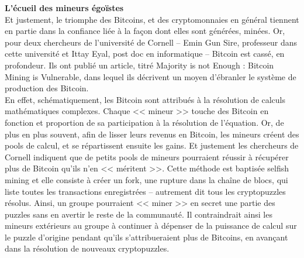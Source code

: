 \documentclass[11pt,twoside,a4paper]{article}
\begin{document}
\textbf{L'{\'e}cueil des mineurs {\'e}go{\"i}stes} ~\\

Et justement, le triomphe des Bitcoins, et des cryptomonnaies en g{\'e}n{\'e}ral tiennent en partie dans la confiance li{\'e}e {\`a} la fa\c{c}on dont elles sont g{\'e}n{\'e}r{\'e}es, min{\'e}es. Or, pour deux chercheurs de l'universit{\'e} de Cornell -- Emin Gun Sire, professeur dans cette universit{\'e} et Ittay Eyal, post doc en informatique -- Bitcoin est cass{\'e}, en profondeur. Ils ont publi{\'e} un article, titr{\'e} Majority is not Enough : Bitcoin Mining is Vulnerable, dans lequel ils d{\'e}crivent un moyen d'{\'e}branler le syst{\`e}me de production des Bitcoin. ~\\

En effet, sch{\'e}matiquement, les Bitcoin sont attribu{\'e}s {\`a} la r{\'e}solution de calculs math{\'e}matiques complexes. Chaque << mineur >> touche des Bitcoin en fonction et proportion de sa participation {\`a} la r{\'e}solution de l'{\'e}quation. Or, de plus en plus souvent, afin de lisser leurs revenus en Bitcoin, les mineurs cr{\'e}ent des pools de calcul, et se r{\'e}partissent ensuite les gains. Et justement les chercheurs de Cornell indiquent que de petits pools de mineurs pourraient r{\'e}ussir {\`a} r{\'e}cup{\'e}rer plus de Bitcoin qu'ils n'en << m{\'e}ritent >>. Cette m{\'e}thode est baptis{\'e}e selfish mining  et elle consiste {\`a} cr{\'e}er un fork, une rupture dans la cha{\^i}ne de blocs, qui liste toutes les transactions enregistr{\'e}es -- autrement dit tous les cryptopuzzles r{\'e}solus. Ainsi, un groupe pourraient << miner >> en secret une partie des puzzles sans en avertir le reste de la communaut{\'e}. Il contraindrait ainsi les mineurs ext{\'e}rieurs au groupe {\`a} continuer {\`a} d{\'e}penser de la puissance de calcul sur le puzzle d'origine pendant qu'ils s'attribueraient plus de Bitcoins, en avan\c{c}ant dans la r{\'e}solution de nouveaux cryptopuzzles. ~\\
\end{document}
